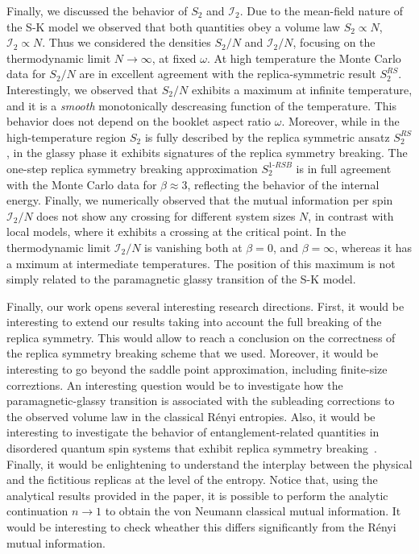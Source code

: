 \documentclass[twocolumn,superscriptaddress,prb,10pt]{revtex4-1}
\begin{document}
Finally, we discussed the behavior of $S_2$ and ${\mathcal I}_2$. Due to the mean-field 
nature of the S-K model we observed that both quantities obey a volume law $S_2\propto N$, 
${\mathcal I}_2\propto N$. Thus we considered the densities $S_2/N$ and ${\mathcal I}_2/N$, 
focusing on the thermodynamic limit $N\to\infty$, at fixed $\omega$. 
At high temperature the Monte Carlo data for $S_2/N$ are in excellent agreement with the 
replica-symmetric result $S_2^{RS}$. Interestingly, we observed that $S_2/N$ exhibits a 
maximum at infinite temperature, and it is a \emph{smooth} monotonically descreasing 
function of the temperature. This behavior does not depend on the booklet aspect ratio 
$\omega$.  Moreover, while in the high-temperature region $S_2$ is fully described by 
the replica symmetric ansatz $S_2^{RS}$, in the glassy phase it exhibits signatures of 
the replica symmetry breaking. The one-step replica symmetry breaking approximation 
$S_2^{1\textrm{-}RSB}$ is in full agreement with the Monte Carlo data for $\beta\approx 3$, 
reflecting the behavior of the internal energy. Finally, we numerically observed that the 
mutual information per spin ${\mathcal I}_2/N$ does not show any crossing for different 
system sizes $N$, in contrast with local models, where it exhibits a crossing at 
the critical point. In the thermodynamic limit ${\mathcal I}_2/N$ is vanishing both 
at $\beta=0$, and $\beta=\infty$, whereas it has a mximum at intermediate temperatures. 
The position of this maximum is not  simply related to the paramagnetic glassy transition 
of the S-K model. 

Finally, our work opens several interesting research directions. First, it would be 
interesting to extend our results taking into account the full breaking of the replica 
symmetry. This would allow to reach a conclusion on the correctness of the replica symmetry 
breaking scheme that we used. Moreover, it would be interesting to go beyond the saddle 
point approximation, including finite-size correztions. An interesting question would be 
to investigate how the paramagnetic-glassy transition is associated with the subleading 
corrections to the observed volume law in the classical R\'enyi entropies. Also, it 
would be interesting to investigate the behavior of entanglement-related quantities in 
disordered quantum spin systems that exhibit replica symmetry breaking~\cite{read-1995, 
andreanov-2012}. Finally, it would be enlightening to understand the interplay between 
the physical and the fictitious replicas at the level of the entropy. Notice that,  
using the analytical results provided in the paper, it is possible to perform the 
analytic continuation $n\to 1$ to obtain the von Neumann classical mutual information. 
It would be interesting to check wheather this differs significantly from the 
R\'enyi mutual information. 
\end{document}
